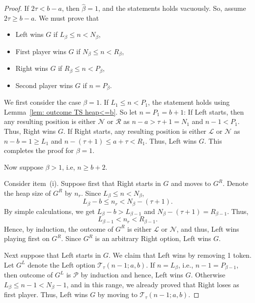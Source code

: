 \documentclass[10pt,a4paper]{amsart}
\newcommand{\hbeta}{\widehat\beta}
\newcommand{\lp}{\mathscr{L}}
\newcommand{\np}{\mathscr{N}}
\newcommand{\pp}{\mathscr{P}}
\newcommand{\rp}{\mathscr{R}}
\newcommand{\ts}{\mathcal{T}}
\begin{document}
\begin{proof}
    If $2\tau<b-a$, then $\hbeta=1$, and the statements holds vacuously. So, assume $2\tau\ge b-a$. We must prove that
    \begin{itemize}
        \item[(i)] Left wins $G$ if $L_\beta\le n< N_\beta$,
        \item[(ii)] First player wins $G$ if $N_\beta\le n< R_\beta$,
        \item[(iii)] Right wins $G$ if $R_\beta\le n< P_\beta$,
        \item[(iv)] Second player wins $G$ if $n=P_\beta$.
    \end{itemize}

    We first consider the case $\beta=1$. If $L_1\le n<P_1$, the statement holds using Lemma~\ref{lem: outcome TS heap<=b}. So let $n=P_1=b+1$: If Left starts, then any resulting position is either $\np$ or $\rp$ as $n-a>\tau+1=N_1$ and $n-1<P_1$. Thus, Right wins $G$. If Right starts, any resulting position is either $\lp$ or $\np$ as $n-b=1\ge L_1$ and $n-(\tau+1)\le a+\tau<R_1$. Thus, Left wins $G$. This completes the proof for $\beta=1$. 
    
    Now suppose $\beta>1$, i.e, $n\ge b+2$.

    
    Consider item~(i).  Suppose first that Right starts in $G$ and moves to $G^R$. Denote the heap size of $G^R$ by $n_r$. Since $L_\beta\le n< N_\beta$, $$L_\beta-b\le n_r<N_\beta-(\tau+1).$$ By simple calculations, we get $L_\beta-b>L_{\beta-1}$ and $N_\beta-(\tau+1)=R_{\beta-1}$. Thus, $$L_{\beta-1}<n_r< R_{\beta-1}.$$ Hence, by induction, the outcome of $G^R$ is either $\lp$ or $\np$, and thus, Left wins playing first on $G^R$. Since $G^R$ is an arbitrary Right option, Left wins $G$. 
    
    Next suppose that Left starts in $G$. We claim that Left wins by removing 1 token. Let $G^L$ denote the Left option $\ts_\tau(n-1;a,b)$. If $n=L_\beta$, i.e., $n-1=P_{\beta-1}$, then outcome of $G^L$ is $\pp$ by induction and hence, Left wins $G$. Otherwise $L_\beta\le n-1< N_\beta-1$, and in this range, we already proved that Right loses as first player. Thus, Left wins $G$ by moving to $\ts_\tau(n-1;a,b)$.
    

\end{proof}
\end{document}
